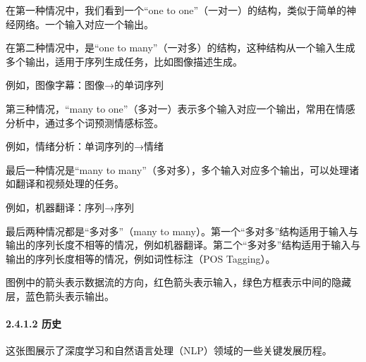 在第一种情况中，我们看到一个``one to
one''（一对一）的结构，类似于简单的神经网络。一个输入对应一个输出。


在第二种情况中，是``one to
many''（一对多）的结构，这种结构从一个输入生成多个输出，适用于序列生成任务，比如图像描述生成。

例如，图像字幕：图像→的单词序列

第三种情况，``many to
one''（多对一）表示多个输入对应一个输出，常用在情感分析中，通过多个词预测情感标签。

例如，情绪分析：单词序列的→情绪

最后一种情况是``many to
many''（多对多），多个输入对应多个输出，可以处理诸如翻译和视频处理的任务。

例如，机器翻译：序列→序列

最后两种情况都是``多对多''（many to
many）。第一个``多对多''结构适用于输入与输出的序列长度不相等的情况，例如机器翻译。第二个``多对多''结构适用于输入与输出的序列长度相等的情况，例如词性标注（POS
Tagging）。

图例中的箭头表示数据流的方向，红色箭头表示输入，绿色方框表示中间的隐藏层，蓝色箭头表示输出。

\paragraph{\texorpdfstring{\textbf{2.4.1.2
历史}}{2.4.1.2 历史}}\label{2412-ux5386ux53f2}


这张图展示了深度学习和自然语言处理（NLP）领域的一些关键发展历程。

